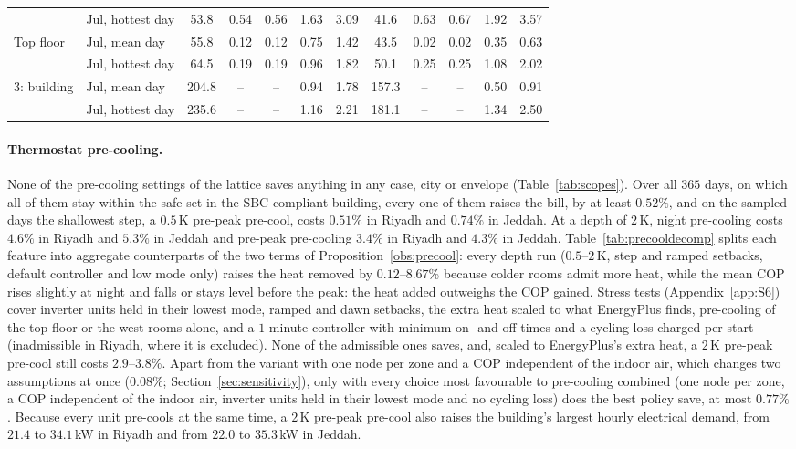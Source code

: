 \documentclass[10pt,a4paper,twocolumn]{article}
\theoremstyle{definition}
\begin{document}
\begin{table}[t]
\begin{tabularx}{\linewidth}{l l C C C C C C C C C C}
 & Jul, hottest day & 53.8 & 0.54 & 0.56 & 1.63 & 3.09 & 41.6 & 0.63 & 0.67 & 1.92 & 3.57 \\
Top floor & Jul, mean day & 55.8 & 0.12 & 0.12 & 0.75 & 1.42 & 43.5 & 0.02 & 0.02 & 0.35 & 0.63 \\
 & Jul, hottest day & 64.5 & 0.19 & 0.19 & 0.96 & 1.82 & 50.1 & 0.25 & 0.25 & 1.08 & 2.02 \\
3: building & Jul, mean day & 204.8 & -- & -- & 0.94 & 1.78 & 157.3 & -- & -- & 0.50 & 0.91 \\
 & Jul, hottest day & 235.6 & -- & -- & 1.16 & 2.21 & 181.1 & -- & -- & 1.34 & 2.50 \\
\bottomrule
\end{tabularx}
\end{table}

\paragraph{Thermostat pre-cooling.} None of the pre-cooling settings of the lattice saves anything in any case, city or envelope (Table~\ref{tab:scopes}). Over all $365$ days, on which all of them stay within the safe set in the SBC-compliant building, every one of them raises the bill, by at least $0.52\%$, and on the sampled days the shallowest step, a $0.5\,$K pre-peak pre-cool, costs $0.51\%$ in Riyadh and $0.74\%$ in Jeddah. At a depth of $2\,$K, night pre-cooling costs $4.6\%$ in Riyadh and $5.3\%$ in Jeddah and pre-peak pre-cooling $3.4\%$ in Riyadh and $4.3\%$ in Jeddah. Table~\ref{tab:precooldecomp} splits each feature into aggregate counterparts of the two terms of Proposition~\ref{obs:precool}: every depth run ($0.5$--$2\,$K, step and ramped setbacks, default controller and low mode only) raises the heat removed by $0.12$--$8.67$\% because colder rooms admit more heat, while the mean COP rises slightly at night and falls or stays level before the peak: the heat added outweighs the COP gained. Stress tests (Appendix~\ref{app:S6}) cover inverter units held in their lowest mode, ramped and dawn setbacks, the extra heat scaled to what EnergyPlus finds, pre-cooling of the top floor or the west rooms alone, and a $1$-minute controller with minimum on- and off-times and a cycling loss charged per start (inadmissible in Riyadh, where it is excluded). None of the admissible ones saves, and, scaled to EnergyPlus's extra heat, a $2\,$K pre-peak pre-cool still costs $2.9$--$3.8$\%. Apart from the variant with one node per zone and a COP independent of the indoor air, which changes two assumptions at once ($0.08\%$; Section~\ref{sec:sensitivity}), only with every choice most favourable to pre-cooling combined (one node per zone, a COP independent of the indoor air, inverter units held in their lowest mode and no cycling loss) does the best policy save, at most $0.77\%$. Because every unit pre-cools at the same time, a $2\,$K pre-peak pre-cool also raises the building's largest hourly electrical demand, from $21.4$ to $34.1\,$kW in Riyadh and from $22.0$ to $35.3\,$kW in Jeddah.
\end{document}
